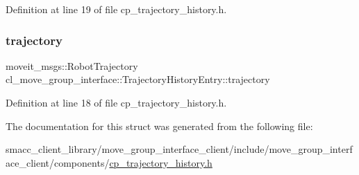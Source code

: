 Definition at line 19 of file cp\+\_\+trajectory\+\_\+history.\+h.

\mbox{\label{structcl__move__group__interface_1_1TrajectoryHistoryEntry_ac8c522a778fd0779f9550a6a77a4bd02}} 
\subsubsection{\texorpdfstring{trajectory}{trajectory}}
{\footnotesize\ttfamily moveit\+\_\+msgs\+::\+Robot\+Trajectory cl\+\_\+move\+\_\+group\+\_\+interface\+::\+Trajectory\+History\+Entry\+::trajectory}



Definition at line 18 of file cp\+\_\+trajectory\+\_\+history.\+h.



The documentation for this struct was generated from the following file\+:\begin{DoxyCompactItemize}
\item 
smacc\+\_\+client\+\_\+library/move\+\_\+group\+\_\+interface\+\_\+client/include/move\+\_\+group\+\_\+interface\+\_\+client/components/\hyperlink{cp__trajectory__history_8h}{cp\+\_\+trajectory\+\_\+history.\+h}\end{DoxyCompactItemize}
